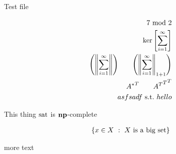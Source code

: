 \documentclass[12pt]{article}
\begin{document}
Test file

\begin{align*}
  {7\ \mathrm{mod}\ 2} \\
  {\mathrm{ker}\left[\sum_{i = 1}^\infty\right]} \\
  {\left({\left\lVert\sum_{i = 1}^\infty\right\rVert}\right)} \qquad
    {\left({\left\lVert\sum_{i = 1}^\infty\right\rVert}_{1 + 1}\right)} \\
  {{A^{\ast}}^{T}} \qquad {{{A^{T}}^{T}}^{T}} \\
  asfsadf {\ \mathrm{s.t.}\ } hello \\
\end{align*}

This thing ${\text{sat}}$ is ${\mathbf{np}}$-complete

\begin{align*}
  {\left\{ x \in X\ :\ \text{\text{$X$ is a big set}}\right\}}
\end{align*}

more text
\end{document}
